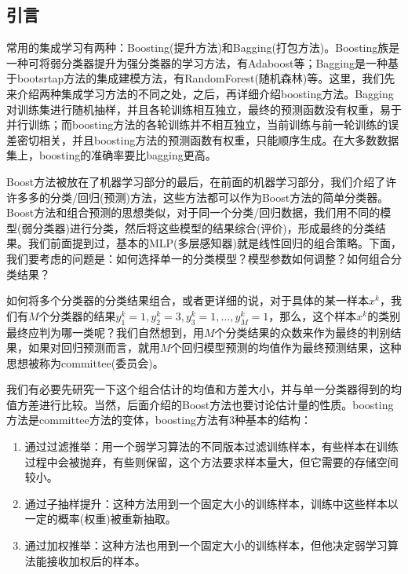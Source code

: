     \subsection{引言}
        \par
        常用的集成学习有两种：Boosting(提升方法)和Bagging(打包方法)\cite{1999.Bauer}\cite{2000.Dietterich}。Boosting族是一种可将弱分类器提升为强分类器的学习方法，有Adaboost等；Bagging是一种基于bootsrtap方法的集成建模方法，有RandomForest(随机森林)等。这里，我们先来介绍两种集成学习方法的不同之处，之后，再详细介绍boosting方法。Bagging对训练集进行随机抽样，并且各轮训练相互独立，最终的预测函数没有权重，易于并行训练；而boosting方法的各轮训练并不相互独立，当前训练与前一轮训练的误差密切相关，并且boosting方法的预测函数有权重，只能顺序生成。在大多数数据集上，boosting的准确率要比bagging更高。
        \par
        Boost方法被放在了机器学习部分的最后，在前面的机器学习部分，我们介绍了许许多多的分类/回归(预测)方法，这些方法都可以作为Boost方法的简单分类器。Boost方法和组合预测的思想类似，对于同一个分类/回归数据，我们用不同的模型(弱分类器)进行分类，然后将这些模型的结果综合(评价)，形成最终的分类结果。我们前面提到过，基本的MLP(多层感知器)就是线性回归的组合策略。下面，我们要考虑的问题是：如何选择单一的分类模型？模型参数如何调整？如何组合分类结果？
        \par
        如何将多个分类器的分类结果组合，或者更详细的说，对于具体的某一样本$x^k$，我们有$M$个分类器的结果$y_1^k = 1,y_2^k = 3,y_3^k = 1,\dots,y_M^k = 1$，那么，这个样本$x^k$的类别最终应判为哪一类呢？我们自然想到，用$M$个分类结果的众数来作为最终的判别结果，如果对回归预测而言，就用$M$个回归模型预测的均值作为最终预测结果，这种思想被称为committee(委员会)。
        \par
        我们有必要先研究一下这个组合估计的均值和方差大小，并与单一分类器得到的均值方差进行比较。当然，后面介绍的Boost方法也要讨论估计量的性质。boosting方法是committee方法的变体，boosting方法有3种基本的结构：
        \begin{enumerate}
        \item 通过过滤推举：用一个弱学习算法的不同版本过滤训练样本，有些样本在训练过程中会被抛弃，有些则保留，这个方法要求样本量大，但它需要的存储空间较小。
        \item 通过子抽样提升：这种方法用到一个固定大小的训练样本，训练中这些样本以一定的概率(权重)被重新抽取。
        \item 通过加权推举：这种方法也用到一个固定大小的训练样本，但他决定弱学习算法能接收加权后的样本。
        \end{enumerate}

